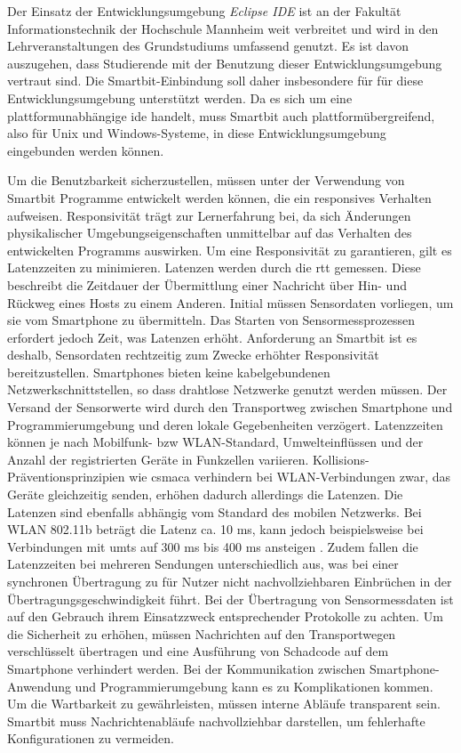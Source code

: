 \documentclass[11pt,a4paper]{report}
\begin{document}
Der Einsatz der Entwicklungsumgebung \textit{Eclipse IDE} \cite{eclipse-ide} ist an der Fakultät Informationstechnik der Hochschule Mannheim weit verbreitet und wird in den Lehrveranstaltungen des Grundstudiums umfassend genutzt.
Es ist davon auszugehen, dass Studierende mit der Benutzung dieser Entwicklungsumgebung vertraut sind.
Die Smartbit-Einbindung soll daher insbesondere für für diese Entwicklungsumgebung unterstützt werden.
Da es sich um eine plattformunabhängige \acrfull{ide} handelt, muss Smartbit auch plattformübergreifend, also für Unix und Windows-Systeme, in diese Entwicklungsumgebung eingebunden werden können.

Um die Benutzbarkeit sicherzustellen, müssen unter der Verwendung von Smartbit Programme entwickelt werden können, die ein responsives Verhalten aufweisen.
Responsivität trägt zur Lernerfahrung bei, da sich Änderungen physikalischer Umgebungseigenschaften unmittelbar auf das Verhalten des entwickelten Programms auswirken.
Um eine Responsivität zu garantieren, gilt es Latenzzeiten zu minimieren.
Latenzen werden durch die \acrfull{rtt} gemessen.
Diese beschreibt die Zeitdauer der Übermittlung einer Nachricht über Hin- und Rückweg eines Hosts zu einem Anderen.
Initial müssen Sensordaten vorliegen, um sie vom Smartphone zu übermitteln.
Das Starten von Sensormessprozessen erfordert jedoch Zeit, was Latenzen erhöht.
Anforderung an Smartbit ist es deshalb, Sensordaten rechtzeitig zum Zwecke erhöhter Responsivität bereitzustellen. 
Smartphones bieten keine kabelgebundenen Netzwerkschnittstellen, so dass drahtlose Netzwerke genutzt werden müssen.
Der Versand der Sensorwerte wird durch den Transportweg zwischen Smartphone und Programmierumgebung und deren lokale Gegebenheiten verzögert.
Latenzzeiten können je nach Mobilfunk- bzw WLAN-Standard, Umwelteinflüssen und der Anzahl der registrierten Geräte in Funkzellen variieren.
Kollisions-Präventionsprinzipien wie \acrfull{csmaca} verhindern bei WLAN-Verbindungen zwar, das Geräte gleichzeitig senden, erhöhen dadurch allerdings die Latenzen.
Die Latenzen sind ebenfalls abhängig vom Standard des mobilen Netzwerks.
Bei WLAN 802.11b beträgt die Latenz ca. 10 ms, kann jedoch beispielsweise bei Verbindungen mit \acrfull{umts} auf 300 ms bis 400 ms ansteigen \cite{network_latencies}.
Zudem fallen die Latenzzeiten bei mehreren Sendungen unterschiedlich aus, was bei einer synchronen Übertragung zu für Nutzer nicht nachvollziehbaren Einbrüchen  in der Übertragungsgeschwindigkeit führt.
Bei der Übertragung von Sensormessdaten ist auf den Gebrauch ihrem Einsatzzweck entsprechender Protokolle zu achten.
Um die Sicherheit zu erhöhen, müssen Nachrichten auf den Transportwegen verschlüsselt übertragen und eine Ausführung von Schadcode auf dem Smartphone verhindert werden.
Bei der Kommunikation zwischen Smartphone-Anwendung und Programmierumgebung kann es zu Komplikationen kommen.
Um die Wartbarkeit zu gewährleisten, müssen interne Abläufe transparent sein.
Smartbit muss Nachrichtenabläufe nachvollziehbar darstellen, um fehlerhafte Konfigurationen zu vermeiden.
\end{document}
